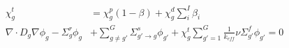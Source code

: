\begin{align}
  \chi_g^t &= \chi_g^p (1 - \beta) + \chi_g^d \sum_i^I \beta_i  \label{eq:chit} \\
  \nabla \cdot D_g \nabla \phi_g - \Sigma_g^r \phi_g & + \sum_{g \ne g'}^G \Sigma_{g'\rightarrow g}^s \phi_{g'} +
  \chi_g^t \sum_{g' = 1}^G \frac{1}{k_{eff}}\nu \Sigma_{g'}^f \phi_{g'} = 0 \label{eq:eigenvalue}
\end{align}




